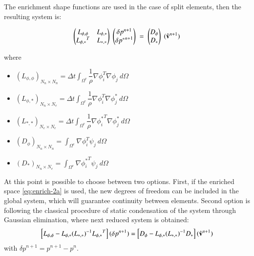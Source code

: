 The enrichment shape functions are used in the case of split elements, then the resulting system is:

  \begin{equation*}
   \begin{pmatrix}
      L_{\phi,\phi} & L_{\phi,*}\\
      {L_{\phi,*}}^T & L_{*,*}
   \end{pmatrix}\;
    \begin{pmatrix}
      \delta p^{n+1}\\
      \delta {p^*}^{n+1}
   \end{pmatrix}\; = \;
   \begin{pmatrix}
      D_{\phi}\\
      D_*
   \end{pmatrix}\;
   (\hat{\mathbf{v}}^{n+1})
   \label{poisson}
\end{equation*}

where
\begin{itemize}
 \item ${(L_{\phi,\phi})}_{N_n\times N_n} = \Delta t \displaystyle \int_{\Omega^e} \dfrac{1}{\rho} \nabla \phi_i^T \nabla \phi_j \ d\Omega$
 \item ${(L_{\phi,*})}_{N_n\times N_e} = \Delta t \displaystyle \int_{\Omega^e} \dfrac{1}{\rho} \nabla \phi_i^T \nabla \phi_j^* \ d\Omega$
 \item ${(L_{*,*})}_{N_e\times N_e} = \Delta t \displaystyle \int_{\Omega^e} \dfrac{1}{\rho} \nabla {\phi_i^*}^T \nabla \phi_j^* \ d\Omega$
 \item ${(D_{\phi})}_{N_n\times N_n} = \displaystyle \int_{\Omega^e} \nabla \phi_i^T \psi_j \ d\Omega$
 \item ${(D_*)}_{N_n\times N_e} = \displaystyle \int_{\Omega^e}  \nabla {\phi_i^*}^T \psi_j \ d\Omega$
\end{itemize}

At this point is possible to choose between two options. First, if the enriched space \ref{eq:enrich-2a} is used, the new degrees of freedom can be included in the global system, which will guarantee continuity between elements. Second option is following the classical procedure of static condensation of the system through Gaussian elimination\cite{Felippa04}, where next reduced system is obtained:
  \begin{equation}
   \left[L_{\phi,\phi} - L_{\phi,*}{(L_{*,*})}^{-1}{L_{\phi,*}}^T\right](\delta p^{n+1}) = \left[D_{\phi}- L_{\phi,*}{(L_{*,*})}^{-1}D_{*}\right](\hat{\mathbf{v}}^{n+1})
   \label{condensing}
  \end{equation}
with $\delta p^{n+1} = p^{n+1}-p^{n}$.

